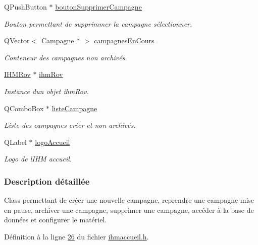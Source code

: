 \begin{DoxyCompactItemize}
Q\+Push\+Button $\ast$ \hyperlink{class_i_h_m_accueil_afb409fb4395372f35f9f8699fcb4c89b}{bouton\+Supprimer\+Campagne}
\begin{DoxyCompactList}\small\item\em Bouton permettant de supprimmer la campagne sélectionner. \end{DoxyCompactList}\item 
Q\+Vector$<$ \hyperlink{class_campagne}{Campagne} $\ast$ $>$ \hyperlink{class_i_h_m_accueil_ad3827b81480eb201b5927c16a2ad1c46}{campagnes\+En\+Cours}
\begin{DoxyCompactList}\small\item\em Conteneur des campagnes non archivés. \end{DoxyCompactList}\item 
\hyperlink{class_i_h_m_rov}{I\+H\+M\+Rov} $\ast$ \hyperlink{class_i_h_m_accueil_af9f2613056b21bdf82e8f54a26146acc}{ihm\+Rov}
\begin{DoxyCompactList}\small\item\em Instance d\textquotesingle{}un objet ihm\+Rov. \end{DoxyCompactList}\item 
Q\+Combo\+Box $\ast$ \hyperlink{class_i_h_m_accueil_afb828a4e06c25afa40341c310cd85b08}{liste\+Campagne}
\begin{DoxyCompactList}\small\item\em Liste des campagnes créer et non archivés. \end{DoxyCompactList}\item 
Q\+Label $\ast$ \hyperlink{class_i_h_m_accueil_a709440124f3307589eee68c517833e6d}{logo\+Accueil}
\begin{DoxyCompactList}\small\item\em Logo de l\textquotesingle{}I\+HM accueil. \end{DoxyCompactList}\end{DoxyCompactItemize}


\subsubsection{Description détaillée}
Class permettant de créer une nouvelle campagne, reprendre une campagne mise en pause, archiver une campagne, supprimer une campagne, accéder à la base de données et configurer le matériel. 

Définition à la ligne \hyperlink{ihmaccueil_8h_source_l00026}{26} du fichier \hyperlink{ihmaccueil_8h_source}{ihmaccueil.\+h}.



